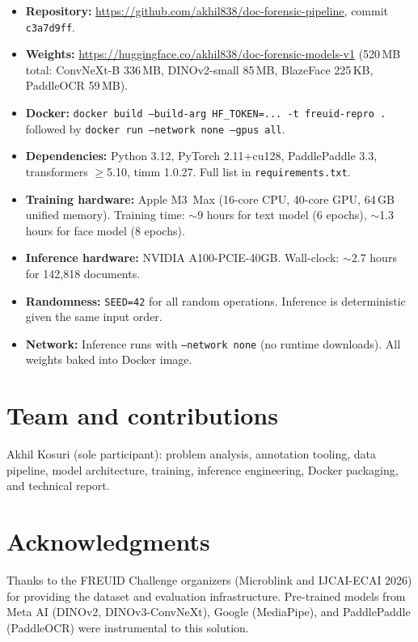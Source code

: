 \documentclass[11pt,a4paper]{article}
\begin{document}
\begin{itemize}[noitemsep]
  \item \textbf{Repository:} \url{https://github.com/akhil838/doc-forensic-pipeline},
        commit \texttt{c3a7d9ff}.
  \item \textbf{Weights:} \url{https://huggingface.co/akhil838/doc-forensic-models-v1}
        (520\,MB total: ConvNeXt-B 336\,MB, DINOv2-small 85\,MB, BlazeFace 225\,KB,
        PaddleOCR 59\,MB).
  \item \textbf{Docker:} \texttt{docker build --build-arg HF\_TOKEN=... -t freuid-repro .}
        followed by \texttt{docker run --network none --gpus all}.
  \item \textbf{Dependencies:} Python 3.12, PyTorch 2.11+cu128, PaddlePaddle 3.3,
        transformers $\geq$5.10, timm 1.0.27. Full list in \texttt{requirements.txt}.
  \item \textbf{Training hardware:} Apple M3~Max (16-core CPU, 40-core GPU,
        64\,GB unified memory). Training time: $\sim$9 hours for text model
        (6 epochs), $\sim$1.3 hours for face model (8 epochs).
  \item \textbf{Inference hardware:} NVIDIA A100-PCIE-40GB.
        Wall-clock: $\sim$2.7 hours for 142{,}818 documents.
  \item \textbf{Randomness:} \texttt{SEED=42} for all random operations.
        Inference is deterministic given the same input order.
  \item \textbf{Network:} Inference runs with \texttt{--network none}
        (no runtime downloads). All weights baked into Docker image.
\end{itemize}

\section{Team and contributions}

Akhil Kosuri (sole participant): problem analysis, annotation tooling,
data pipeline, model architecture, training, inference engineering,
Docker packaging, and technical report.

\section*{Acknowledgments}

Thanks to the FREUID Challenge organizers (Microblink and IJCAI-ECAI 2026) for
providing the dataset and evaluation infrastructure.
Pre-trained models from Meta AI (DINOv2, DINOv3-ConvNeXt), Google (MediaPipe),
and PaddlePaddle (PaddleOCR) were instrumental to this solution.
\end{document}
